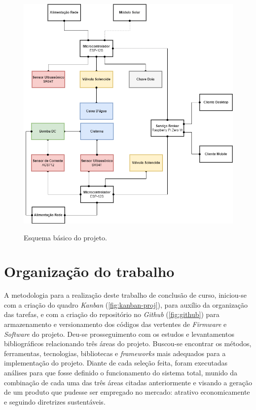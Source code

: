 \begin{figure}[H]
	\centering
	\caption{Esquema básico do projeto.}
	\includegraphics[width=1.0\textwidth]{figuras/esquema_basico_proj_2.png}
	\label{fig:esquema_proj}
\end{figure} 

\section{Organização do trabalho}

A metodologia para a realização deste trabalho de conclusão de curso, iniciou-se com a criação do quadro \textit{Kanban} (\autoref{fig:kanban-proj}), para auxílio da organização das tarefas, e com a criação do repositório no \textit{Github} (\autoref{fig:github}) para armazenamento e versionamento dos códigos das vertentes de \textit{Firmware} e \textit{Software} do projeto. Deu-se prosseguimento com os estudos e levantamentos bibliográficos relacionando três áreas do projeto. Buscou-se encontrar os métodos,  ferramentas, tecnologias, bibliotecas e \textit{frameworks} mais adequados para a implementação do projeto.  Diante de cada seleção feita, foram executadas análises para que fosse definido o funcionamento do sistema total, munido da combinação de cada uma das três áreas citadas anteriormente e visando a geração de um produto que pudesse ser empregado no mercado: atrativo economicamente e seguindo diretrizes sustentáveis.  


